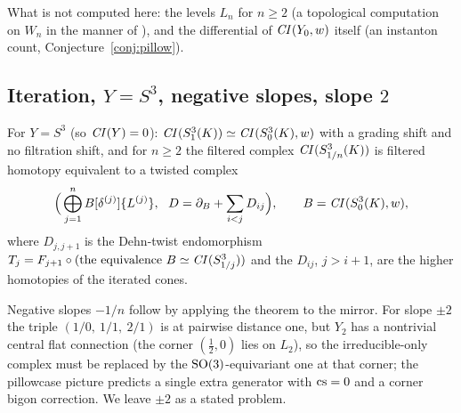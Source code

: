 What is not computed here: the levels $L_n$ for $n\ge2$ (a topological computation on $W_n$ in the manner of
\cite{DLM}), and the differential of $\mathit{CI}(Y_0,w)$ itself (an instanton count, Conjecture~\ref{conj:pillow}).

\subsection{Iteration, $Y=S^3$, negative slopes, slope $2$}
\begin{corollary}\label{cor:iter}
For $Y=S^3$ (so $\mathit{CI}(Y)=0$): $\mathit{CI}(S^3_1(K))\simeq\mathit{CI}(S^3_0(K),w)$ with a grading shift and no filtration shift,
and for $n\ge2$ the filtered complex $\mathit{CI}(S^3_{1/n}(K))$ is filtered homotopy equivalent to a twisted complex
\[
\Big(\bigoplus_{j=1}^{n}B[\delta^{(j)}]\{L^{(j)}\},\ \ D=\partial_B+\sum_{i<j}D_{ij}\Big),\qquad B=\CI(S^3_0(K),w),
\]
where $D_{j,j+1}$ is the Dehn-twist endomorphism $T_j=F_{j+1}\circ(\text{the equivalence }B\simeq\mathit{CI}(S^3_{1/j}))$
and the $D_{ij}$, $j>i+1$, are the higher homotopies of the iterated cones.
\end{corollary}
Negative slopes $-1/n$ follow by applying the theorem to the mirror.  For slope $\pm2$ the triple
$(1/0,\ 1/1,\ 2/1)$ is at pairwise distance one, but $Y_{2}$ has a nontrivial central flat connection
(the corner $(\tfrac12,0)$ lies on $L_2$), so the irreducible-only complex must be replaced by the
$\operatorname{SO}(3)$-equivariant one at that corner; the pillowcase picture predicts a single extra generator with
$\mathrm{cs}=0$ and a corner bigon correction.  We leave $\pm2$ as a stated problem.
